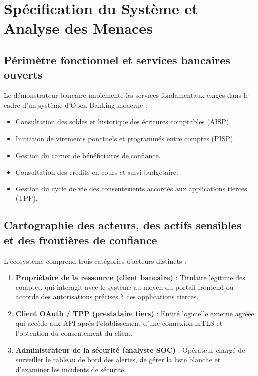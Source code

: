 \clearpage
\section{Spécification du Système et Analyse des Menaces}

\subsection{Périmètre fonctionnel et services bancaires ouverts}
Le démonstrateur bancaire implémente les services fondamentaux exigés dans le cadre d'un système d'Open Banking moderne :
\begin{itemize}[leftmargin=*]
    \item Consultation des soldes et historique des écritures comptables (AISP).
    \item Initiation de virements ponctuels et programmés entre comptes (PISP).
    \item Gestion du carnet de bénéficiaires de confiance.
    \item Consultation des crédits en cours et suivi budgétaire.
    \item Gestion du cycle de vie des consentements accordés aux applications tierces (TPP).
\end{itemize}

\subsection{Cartographie des acteurs, des actifs sensibles et des frontières de confiance}
L'écosystème comprend trois catégories d'acteurs distincts :
\begin{enumerate}[leftmargin=*]
    \item \textbf{Propriétaire de la ressource (client bancaire)} : Titulaire légitime des comptes, qui interagit avec le système au moyen du portail frontend ou accorde des autorisations précises à des applications tierces.
    \item \textbf{Client OAuth / TPP (prestataire tiers)} : Entité logicielle externe agréée qui accède aux API après l'établissement d'une connexion mTLS et l'obtention du consentement du client.
    \item \textbf{Administrateur de la sécurité (analyste SOC)} : Opérateur chargé de surveiller le tableau de bord des alertes, de gérer la liste blanche et d'examiner les incidents de sécurité.
\end{enumerate}

